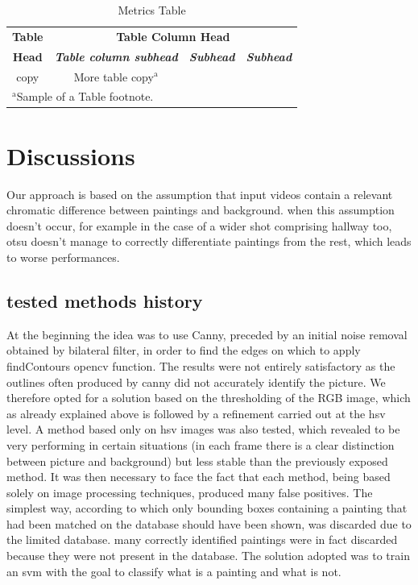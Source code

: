 \documentclass[conference]{IEEEtran}
\begin{document}
\begin{table}[htbp]
\caption{Metrics Table}
\begin{center}
\begin{tabular}{|c|c|c|c|}
\hline
\textbf{Table}&\multicolumn{3}{|c|}{\textbf{Table Column Head}} \\
\cline{2-4} 
\textbf{Head} & \textbf{\textit{Table column subhead}}& \textbf{\textit{Subhead}}& \textbf{\textit{Subhead}} \\
\hline
copy& More table copy$^{\mathrm{a}}$& &  \\
\hline
\multicolumn{4}{l}{$^{\mathrm{a}}$Sample of a Table footnote.}
\end{tabular}
\label{tab1}
\end{center}
\end{table}


\section{Discussions}
Our approach is based on the assumption that input videos contain a relevant chromatic difference between paintings and background. when this assumption doesn’t occur, for example in the case of a wider shot comprising hallway too, otsu doesn’t manage to correctly differentiate paintings from the rest, which leads to worse performances.

\subsection{tested methods history}
At the beginning the idea was to use Canny, preceded by an initial noise removal obtained by bilateral filter, in order to find the edges on which to apply findContours opencv function. The results were not entirely satisfactory as the outlines often produced by canny did not accurately identify the picture. We therefore opted for a solution based on the thresholding of the RGB image, which as already explained above is followed by a refinement carried out at the hsv level. A method based only on hsv images was also tested, which revealed to be very performing in certain situations (in each frame there is a clear distinction between picture and background) but less stable than the previously exposed method.
It was then necessary to face the fact that each method, being based solely on image processing techniques, produced many false positives. The simplest way, according to which only bounding boxes containing a painting that had been matched on the database should have been shown, was discarded due to the limited database. many correctly identified paintings were in fact discarded because they were not present in the database. The solution adopted was to train an svm with the goal to classify what is a painting and what is not.
\end{document}
